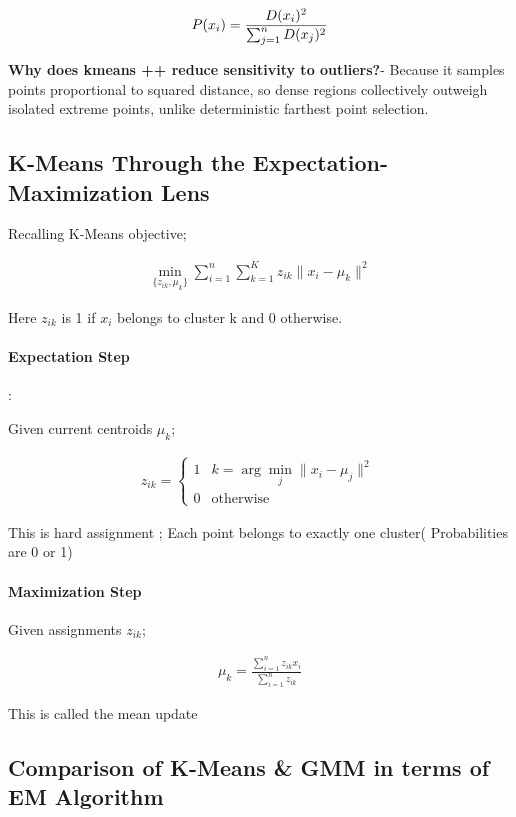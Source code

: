 \documentclass[10pt,a4paper]{article}
\begin{document}
	\begin{align*}\Large P(x_i)=\frac{D(x_i)^2}{\sum_{j=1}^{n} D(x_j)^2}\end{align*}


	\textbf{Why does kmeans ++ reduce sensitivity to outliers?}- Because it samples points proportional to squared distance, so dense regions collectively outweigh isolated extreme points, unlike deterministic farthest point selection.

	\subsection{K-Means Through the Expectation-Maximization Lens}

	Recalling K-Means objective;


	\begin{align*}
		\min_{\{z_{ik}, \mu_k\}}\sum_{i=1}^{n} \sum_{k=1}^{K}z_{ik} \|x_i - \mu_k\|^2
	\end{align*}


	Here $z_{ik}$ is 1 if $x_i$ belongs to cluster k and 0 otherwise.

	\paragraph{Expectation Step}:

	Given current centroids $\mu_{k}$;


	\begin{align*}
		z_{ik} =\begin{cases}1 & k = \arg\min_j \|x_i - \mu_j\|^2 \\0 & \text{otherwise}\end{cases}
	\end{align*}


	This is hard assignment ; Each point belongs to exactly one cluster( Probabilities are 0 or 1)

	\paragraph{Maximization Step}

	Given assignments $z_{ik}$;

	\begin{align*}
		\mu_{k}=\frac{\sum_{i=1}^{n} z_{ik} x_i}{\sum_{i=1}^{n} z_{ik}}
	\end{align*}


	This is called the mean update

\subsection{Comparison of K-Means \& GMM in terms of EM Algorithm}
\end{document}
